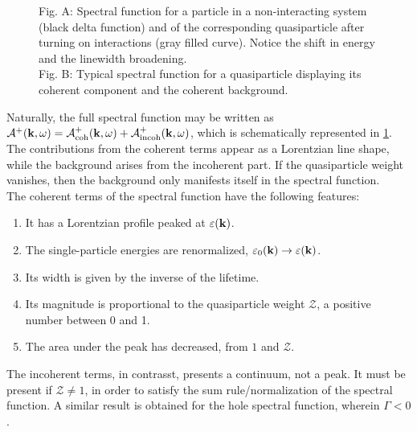 \begin{figure}
    \centering
    \qquad
    \caption{\small Fig. A: Spectral function for a particle in a non-interacting system (black delta function) and of the corresponding quasiparticle after turning on interactions (gray filled curve). Notice the shift in energy and the linewidth broadening. \\
    Fig. B: Typical spectral function for a quasiparticle displaying its coherent component and the coherent background. } 
    \label{figs:1p_Green_f_(in)coh}
\end{figure}

Naturally, the full spectral function may be written as $ \mathcal{A}^{+}({\bf k}, \omega) = \mathcal{A}^{+}_{\textnormal{coh}}({\bf k}, \omega) +  \mathcal{A}^{+}_{\textnormal{incoh}}({\bf k}, \omega) $, which is schematically represented in \cref{figs:1p_Green_f_(in)coh}. The contributions from the coherent terms appear as a Lorentzian line shape, while the background arises from the incoherent part. If the quasiparticle weight vanishes, then the background only manifests itself in the spectral function. \\

The coherent terms of the spectral function have the following features:

\begin{enumerate}
    \item It has a Lorentzian profile peaked at $\varepsilon({\bf k})$. 
    \item The single-particle energies are renormalized, $\varepsilon_0 ({\bf k}) \rightarrow \varepsilon ({\bf k})$. 
    \item Its width is given by the inverse of the lifetime. 
    \item Its magnitude is proportional to the quasiparticle weight $\mathcal{Z}$, a positive number between 0 and 1. 
    \item The area under the peak has decreased, from $1$ and $\mathcal{Z}$.
\end{enumerate}

The incoherent terms, in contrasst, presents a continuum, not a peak. It must be present if $\mathcal{Z} \neq 1$, in order to satisfy the sum rule/normalization of the spectral function. A similar result is obtained for the hole spectral function, wherein $\Gamma < 0$. \\

